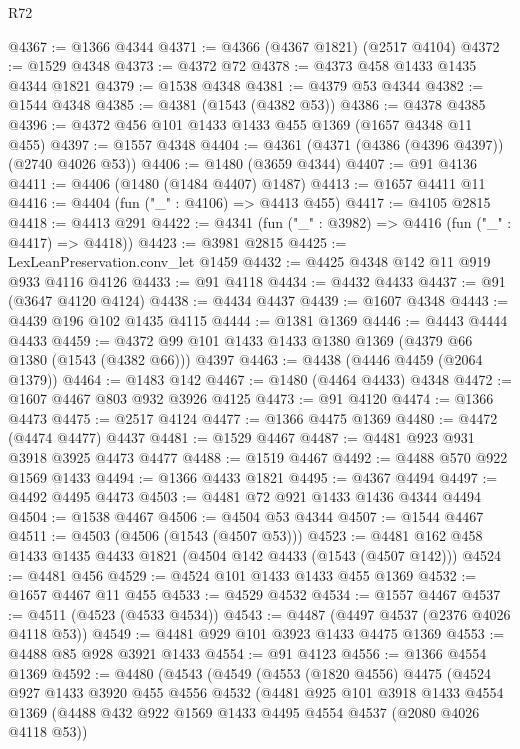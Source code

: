 \begin{lexlean}{R72}
\begin{coremodule}
@4367 := @1366 @4344
@4371 := @4366 (@4367 @1821) (@2517 @4104)
@4372 := @1529 @4348
@4373 := @4372 @72
@4378 := @4373 @458 @1433 @1435 @4344 @1821
@4379 := @1538 @4348
@4381 := @4379 @53 @4344
@4382 := @1544 @4348
@4385 := @4381 (@1543 (@4382 @53))
@4386 := @4378 @4385
@4396 := @4372 @456 @101 @1433 @1433 @455 @1369 (@1657 @4348 @11 @455)
@4397 := @1557 @4348
@4404 := @4361 (@4371 (@4386 (@4396 @4397)) (@2740 @4026 @53))
@4406 := @1480 (@3659 @4344)
@4407 := @91 @4136
@4411 := @4406 (@1480 (@1484 @4407) @1487)
@4413 := @1657 @4411 @11
@4416 := @4404 (fun ("_" : @4106) => @4413 @455)
@4417 := @4105 @2815
@4418 := @4413 @291
@4422 := @4341 (fun ("_" : @3982) => @4416 (fun ("_" : @4417) => @4418))
@4423 := @3981 @2815
@4425 := LexLeanPreservation.conv_let @1459
@4432 := @4425 @4348 @142 @11 @919 @933 @4116 @4126
@4433 := @91 @4118
@4434 := @4432 @4433
@4437 := @91 (@3647 @4120 @4124)
@4438 := @4434 @4437
@4439 := @1607 @4348
@4443 := @4439 @196 @102 @1435 @4115
@4444 := @1381 @1369
@4446 := @4443 @4444 @4433
@4459 := @4372 @99 @101 @1433 @1433 @1380 @1369 (@4379 @66 @1380 (@1543 (@4382 @66))) @4397
@4463 := @4438 (@4446 @4459 (@2064 @1379))
@4464 := @1483 @142
@4467 := @1480 (@4464 @4433) @4348
@4472 := @1607 @4467 @803 @932 @3926 @4125
@4473 := @91 @4120
@4474 := @1366 @4473
@4475 := @2517 @4124
@4477 := @1366 @4475 @1369
@4480 := @4472 (@4474 @4477) @4437
@4481 := @1529 @4467
@4487 := @4481 @923 @931 @3918 @3925 @4473 @4477
@4488 := @1519 @4467
@4492 := @4488 @570 @922 @1569 @1433
@4494 := @1366 @4433 @1821
@4495 := @4367 @4494
@4497 := @4492 @4495 @4473
@4503 := @4481 @72 @921 @1433 @1436 @4344 @4494
@4504 := @1538 @4467
@4506 := @4504 @53 @4344
@4507 := @1544 @4467
@4511 := @4503 (@4506 (@1543 (@4507 @53)))
@4523 := @4481 @162 @458 @1433 @1435 @4433 @1821 (@4504 @142 @4433 (@1543 (@4507 @142)))
@4524 := @4481 @456
@4529 := @4524 @101 @1433 @1433 @455 @1369
@4532 := @1657 @4467 @11 @455
@4533 := @4529 @4532
@4534 := @1557 @4467
@4537 := @4511 (@4523 (@4533 @4534))
@4543 := @4487 (@4497 @4537 (@2376 @4026 @4118 @53))
@4549 := @4481 @929 @101 @3923 @1433 @4475 @1369
@4553 := @4488 @85 @928 @3921 @1433
@4554 := @91 @4123
@4556 := @1366 @4554 @1369
@4592 := @4480
    (@4543
      (@4549
        (@4553
          (@1820 @4556)
          @4475
          (@4524
            @927
            @1433
            @3920
            @455
            @4556
            @4532
            (@4481
              @925
              @101
              @3918
              @1433
              @4554
              @1369
              (@4488 @432 @922 @1569 @1433 @4495 @4554 @4537 (@2080 @4026 @4118 @53))

\end{coremodule}
\end{lexlean}

